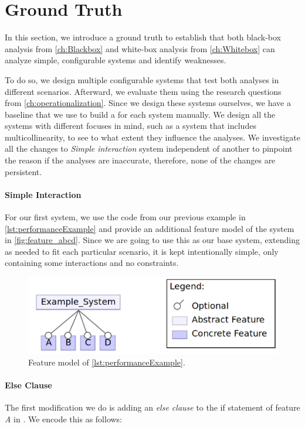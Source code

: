 \section{Ground Truth}\label{sec:ground-truth}
In this section, we introduce a ground truth to establish that both black-box analysis from \autoref{ch:Blackbox} 
and white-box analysis from \autoref{ch:Whitebox} can analyze simple, configurable systems and identify weaknesses. 

To do so, we design multiple configurable systems that test both analyses in different scenarios. 
Afterward, we evaluate them using the research questions from \autoref{ch:operationalization}. 
Since we design these systems ourselves, we have a baseline that we use to build a {\perfInfluenceModel} for each system manually. 
We design all the systems with different focuses in mind, such as a system that includes multicollinearity, 
to see to what extent they influence the analyses. 
We investigate all the changes to \emph{Simple interaction} system independent of another to pinpoint the reason if the analyses
are inaccurate, therefore, none of the changes are persistent.


\paragraph{Simple Interaction}\label{ground-truth:Simple}
For our first system, we use the code from our previous example in \autoref{lst:performanceExample} and provide an additional feature model 
of the system in \autoref{fig:feature_abcd}. 
Since we are going to use this as our base system, extending as needed to fit each
particular scenario, it is kept intentionally simple, only containing some interactions and no constraints.

\begin{figure}[h]
    \centering
    \includegraphics[scale=0.25]{gfx/Feature_ABCD.png}
    \caption{Feature model of \autoref{lst:performanceExample}.}
    \label{fig:feature_abcd}
\end{figure}


\paragraph{Else Clause}
The first modification we do is adding an \emph{else clause} to the if statement of feature \emph{A} in . 
We encode this as follows:

